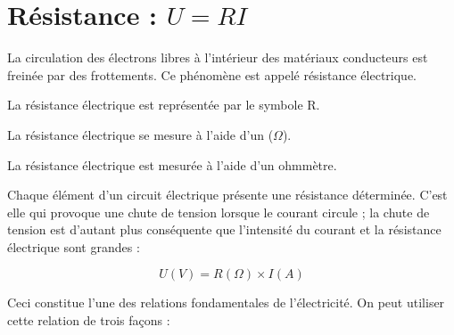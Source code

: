 \section{Résistance : $U = RI$}


La circulation des électrons libres à l’intérieur des matériaux conducteurs est freinée par des frottements. Ce phénomène est appelé résistance électrique.
\vspace{0.3cm}

La résistance électrique est représentée par le symbole R.
\vspace{0.3cm}

La résistance électrique se mesure à l’aide d’un ($ \Omega $).
\vspace{0.3cm}

La résistance électrique est mesurée à l'aide d'un ohmmètre.
\vspace{0.3cm}

Chaque élément d’un circuit électrique présente une résistance déterminée. C’est elle qui provoque une chute de tension lorsque le courant circule ; la chute de tension est d’autant plus conséquente que l’intensité du courant et la résistance électrique sont grandes :


\begin{equation}
  U(V) = R(\Omega) \times I(A)
\end{equation}


Ceci constitue l’une des relations fondamentales de l’électricité. On peut utiliser cette relation de trois façons :


